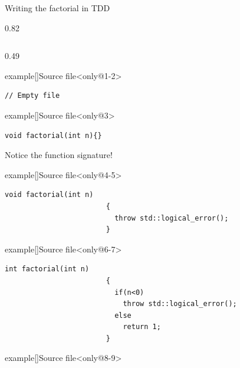 \begin{frame}[fragile]{Writing the factorial in TDD}
    \vspace{-2mm}
    \begin{overlayarea}{\textwidth}{0.82\textheight}
        \begin{columns}[T]
            \begin{column}{0.49\textwidth}
                \begin{varblock}{example}[\textwidth]{Source file}<only@1-2>
                    \begin{lstlisting}[style=MyCpp]
                        // Empty file
                    \end{lstlisting}
                \end{varblock}
                \begin{varblock}{example}[\textwidth]{Source file}<only@3>
                    \begin{lstlisting}[style=MyCpp, belowskip=-9mm]
                        void factorial(int n){}
                    \end{lstlisting}
                    {\scriptsize\alert{Notice the function signature!}}
                \end{varblock}
                \begin{varblock}{example}[\textwidth]{Source file}<only@4-5>
                    \begin{lstlisting}[style=MyCpp, belowskip=-7mm]
                        void factorial(int n)
                        {
                          throw std::logical_error();
                        }
                    \end{lstlisting}
                \end{varblock}
                \begin{varblock}{example}[\textwidth]{Source file}<only@6-7>
                    \begin{lstlisting}[style=MyCpp]
                        int factorial(int n)
                        {
                          if(n<0)
                            throw std::logical_error();
                          else
                            return 1;
                        }
                    \end{lstlisting}
                \end{varblock}
                \begin{varblock}{example}[\textwidth]{Source file}<only@8-9>

\end{varblock}
\end{column}
\end{columns}
\end{overlayarea}
\end{frame}
